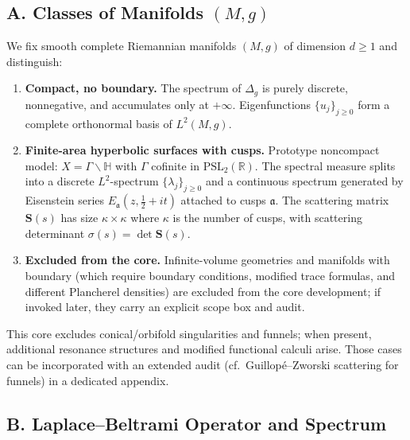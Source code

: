 \subsection*{A. Classes of Manifolds $(M,g)$}
\label{subsec:classes}

We fix smooth complete Riemannian manifolds $(M,g)$ of dimension $d\ge 1$ and distinguish:

\begin{enumerate}[label=(\roman*)]

  \item \textbf{Compact, no boundary.}
  The spectrum of $\Delta_g$ is purely discrete, nonnegative, and accumulates only at $+\infty$.
  Eigenfunctions $\{u_j\}_{j\ge 0}$ form a complete orthonormal basis of $L^2(M,g)$.

  \item \textbf{Finite-area hyperbolic surfaces with cusps.}
  Prototype noncompact model: $X=\Gamma\backslash\mathbb{H}$ with $\Gamma$ cofinite in $\mathrm{PSL}_2(\mathbb{R})$.
  The spectral measure splits into a discrete $L^2$-spectrum $\{\lambda_j\}_{j\ge 0}$ and a continuous spectrum generated by Eisenstein series $E_{\mathfrak a}(z,\tfrac12+it)$ attached to cusps $\mathfrak a$.
  The scattering matrix $\mathbf{S}(s)$ has size $\kappa\times\kappa$ where $\kappa$ is the number of cusps, with scattering determinant $\sigma(s)=\det\mathbf{S}(s)$.

  \item \textbf{Excluded from the core.}
  Infinite-volume geometries and manifolds with boundary (which require boundary conditions, modified trace formulas, and different Plancherel densities) are excluded from the core development; if invoked later, they carry an explicit scope box and audit.

\end{enumerate}

\begin{remark}
This core excludes conical/orbifold singularities and funnels; when present, additional resonance structures and modified functional calculi arise. Those cases can be incorporated with an extended audit (cf.\ Guillopé--Zworski scattering for funnels) in a dedicated appendix.
\end{remark}


\subsection*{B. Laplace--Beltrami Operator and Spectrum}
\label{subsec:laplacian}

